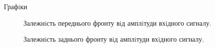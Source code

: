 \documentclass[a4paper,14pt]{extreport}
\begin{document}
  \begin{figure}[h!]
     
  \end{figure}


\begin{center}
Графiки
\end{center}


 \begin{figure}[h!]
    \caption{ Залежнiсть переднього фронту вiд амплiтуди вхiдного сигналу.}
    \label{ris2}
  \end{figure}


 \begin{figure}[h!]
    \caption{  Залежнiсть заднього фронту вiд амплiтуди вхiдного сигналу.}
    \label{ris2}
  \end{figure}
\end{document}
